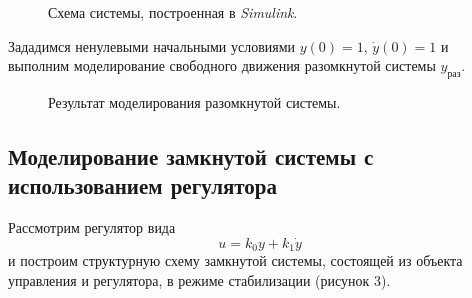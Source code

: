 \documentclass[a5paper, 10pt]{article}
\theoremstyle{definition}
\theoremstyle{plain}
\theoremstyle{remark}
\begin{document}
\begin{figure}[h!]
\caption{Схема системы, построенная в \textit{Simulink}.}
\end{figure}

\newpage
Зададимся ненулевыми начальными условиями $y(0) = 1$, $\dot{y} (0) = 1$ и выполним моделирование свободного движения разомкнутой системы $y_{\text{раз}}$.

\begin{figure}[h!]
\caption{Результат моделирования разомкнутой системы.}
\end{figure}

\subsection{Моделирование замкнутой системы с использованием регулятора}

Рассмотрим регулятор вида
\begin{equation}
u = k_0y+ k_1 \dot{y}
\end{equation}
и построим структурную схему замкнутой системы, состоящей из объекта управления и регулятора, в режиме стабилизации (рисунок 3).
\end{document}
